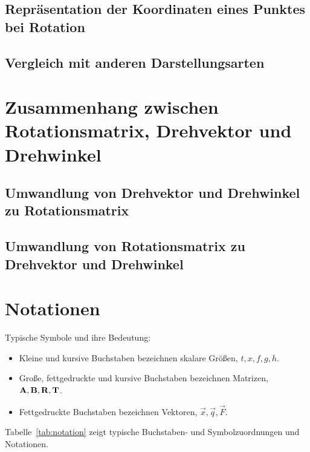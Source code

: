 	\section{Repräsentation der Koordinaten eines Punktes bei Rotation} %

	\section{Vergleich mit anderen Darstellungsarten} %

\chapter{Zusammenhang zwischen Rotationsmatrix, Drehvektor und Drehwinkel} %

	\section{Umwandlung von Drehvektor und Drehwinkel zu Rotationsmatrix} %

	\section{Umwandlung von Rotationsmatrix zu Drehvektor und Drehwinkel} %

\chapter{Notationen}
	Typische Symbole und ihre Bedeutung:
	\begin{itemize}
		\item Kleine und kursive Buchstaben bezeichnen skalare Größen, \zB \( t, x, f, g, h \).
		\item Große, fettgedruckte und kursive Buchstaben bezeichnen Matrizen, \zB \( \boldsymbol{\mathrm{A}}, \boldsymbol{\mathrm{B}}, \boldsymbol{\mathrm{R}}, \boldsymbol{\mathrm{T}} \).
		\item Fettgedruckte Buchstaben bezeichnen Vektoren, \zB \( \vec{x}, \vec{q}, \vec{F} \).
	\end{itemize}
	Tabelle~\ref{tab:notation} zeigt typische Buchstaben- und Symbolzuordnungen und Notationen.

